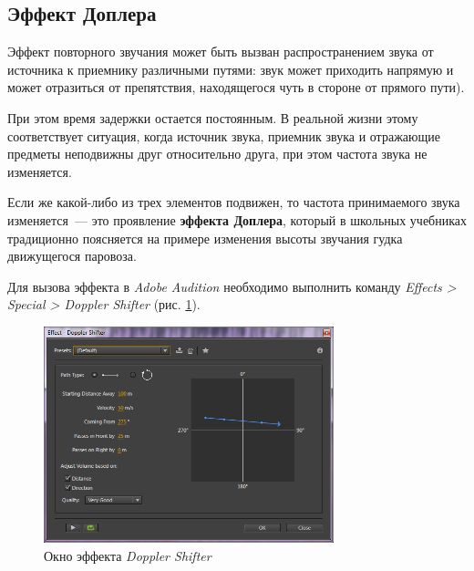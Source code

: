 \documentclass[oneside, final, 14pt]{extreport}
\begin{document}
\subsection{Эффект Доплера}
Эффект повторного звучания может быть вызван распространением звука от источника к приемнику различными путями: звук может приходить напрямую и может отразиться от препятствия, находящегося чуть в стороне от прямого пути).

При этом время задержки остается постоянным. В реальной жизни этому соответствует ситуация, когда источник звука, приемник звука и отражающие предметы неподвижны друг относительно друга, при этом частота звука не изменяется.

Если же какой-либо из трех элементов подвижен, то частота принимаемого звука изменяется~--- это проявление \textbf{эффекта Доплера}, который в школьных учебниках традиционно поясняется на примере изменения высоты звучания гудка движущегося паровоза.

Для вызова эффекта в \emph{Adobe Audition} необходимо выполнить команду \textit{Effects > Special > Doppler Shifter} (рис. \ref{pic-audoppler-01}).

\begin{figure}[h!]
  \centering
  \includegraphics[width=0.75\textwidth]{pic-audoppler-01}
  \caption{Окно эффекта \emph{Doppler Shifter}}
  \label{pic-audoppler-01}
\end{figure}
\end{document}
